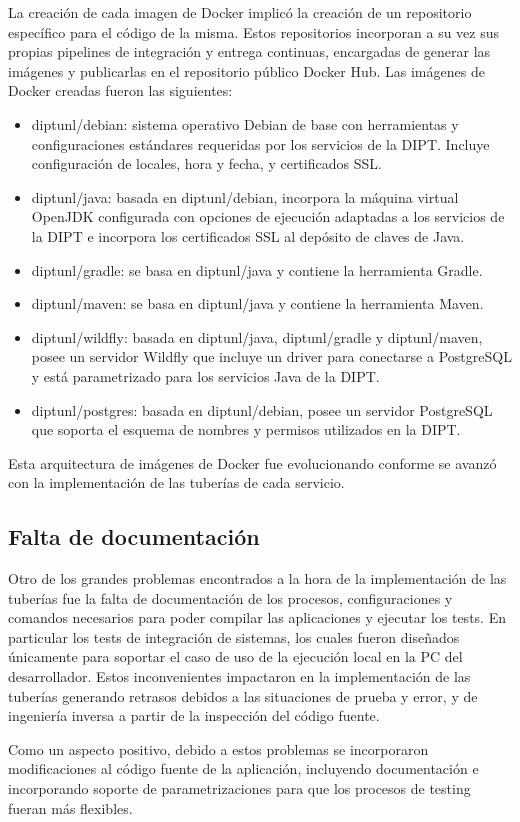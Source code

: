 La creación de cada imagen de Docker implicó la creación de un
repositorio específico para el código de la misma. Estos repositorios
incorporan a su vez sus propias pipelines de integración y entrega
continuas, encargadas de generar las imágenes y publicarlas en el
repositorio público Docker Hub. Las imágenes de Docker creadas fueron
las siguientes:

\begin{itemize}
\item diptunl/debian: sistema operativo Debian de base con
  herramientas y configuraciones estándares requeridas por los
  servicios de la DIPT. Incluye configuración de locales, hora y
  fecha, y certificados SSL.
\item diptunl/java: basada en diptunl/debian, incorpora la máquina
  virtual OpenJDK configurada con opciones de ejecución adaptadas a
  los servicios de la DIPT e incorpora los certificados SSL al
  depósito de claves de Java.
\item diptunl/gradle: se basa en diptunl/java y contiene la
  herramienta Gradle.
\item diptunl/maven: se basa en diptunl/java y contiene la herramienta
  Maven.
\item diptunl/wildfly: basada en diptunl/java, diptunl/gradle y
  diptunl/maven, posee un servidor Wildfly que incluye un driver para
  conectarse a PostgreSQL y está parametrizado para los servicios Java
  de la DIPT.
\item diptunl/postgres: basada en diptunl/debian, posee un servidor
  PostgreSQL que soporta el esquema de nombres y permisos utilizados
  en la DIPT.
\end{itemize}
Esta arquitectura de imágenes de Docker fue evolucionando conforme se
avanzó con la implementación de las tuberías de cada servicio.

\subsection{Falta de documentación}

Otro de los grandes problemas encontrados a la hora de la
implementación de las tuberías fue la falta de documentación de los
procesos, configuraciones y comandos necesarios para poder compilar
las aplicaciones y ejecutar los tests. En particular los tests de
integración de sistemas, los cuales fueron diseñados únicamente para
soportar el caso de uso de la ejecución local en la PC del
desarrollador. Estos inconvenientes impactaron en la implementación de
las tuberías generando retrasos debidos a las situaciones de prueba y
error, y de ingeniería inversa a partir de la inspección del código
fuente.

Como un aspecto positivo, debido a estos problemas se incorporaron
modificaciones al código fuente de la aplicación, incluyendo
documentación e incorporando soporte de parametrizaciones para que los
procesos de testing fueran más flexibles.
